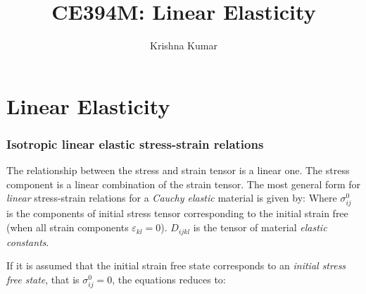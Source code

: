 \documentclass[notes]{beamer}
\title[CE394M: Linear Elasticity]{CE394M: Linear Elasticity}
\author{Krishna Kumar} %
\institute[UT Austin] %
{
University of Texas at Austin \\
\medskip
\textit{
  \url{krishnak@utexas.edu}} %
}
\date{} %
\begin{document}
\begin{frame}
\titlepage %
\end{frame}

\section{Linear Elasticity}
\begin{frame}
\frametitle{Isotropic linear elastic stress-strain relations}
The relationship between the stress and strain tensor is a linear one. The stress component
is a linear combination of the strain tensor. The most general form for \textit{linear} stress-strain relations for a \textit{Cauchy elastic}
material is given by:
	Where $\sigma^0_{ij}$ is the components of initial stress tensor corresponding to the initial strain free (when all strain components $\varepsilon_{kl} = 0$). $D_{ijkl}$ is the tensor of material \textit{elastic constants}.
	
	If it is assumed that the initial strain free state corresponds to an \textit{initial stress free state}, that is $\sigma^0_{ij} = 0$, the equations reduces to:
\end{frame}
\end{document}
